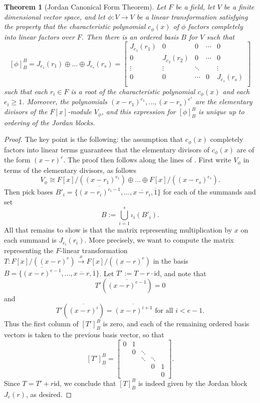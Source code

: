\documentclass[12pt]{report}
\newtheorem{theorem}{Theorem}[chapter]
\numberwithin{equation}{section}
\numberwithin{theorem}{chapter}
\theoremstyle{definition}
\newtheorem*{basic properties}{Basic Properties}
\newtheorem*{Important Remark}{Important Remark}
\begin{document}
\begin{theorem}[Jordan Canonical Form Theorem]\label{JCF}
Let $F$ be a field, let $V$ be a finite dimensional vector space, and let $\phi: V \to V$ be a linear transformation satisfying the property that the characteristic polynomial $c_\phi(x)$ of $\phi$ factors completely into linear factors over $F$. Then there is an ordered basis $B$ for $V$ such that 
$$[\phi]_B^B = J_{e_1}(r_1) \oplus \dots \oplus J_{e_s}(r_s)=
\begin{bmatrix}
J_{e_1}(r_1) & 0 & 0 & \cdots & 0 \\
0 &  J_{e_2}(r_2)  & 0 & \cdots & 0 \\
\vdots & \vdots & \ddots &  & \vdots \\
0 & 0 & \cdots & 0 &  J_{e_s}(r_s) \\
\end{bmatrix}$$ 
such that each $r_i \in F$ is a root of the characteristic polynomial $c_\phi(x)$ and each $e_i \geqslant 1$. Moreover, the polynomials $(x - r_1)^{e_1},\ldots,(x - r_s)^{e^s}$ are the elementary divisors of the $F[x]$-module $V_\phi$, and this expression for $[\phi]_B^B$ is unique up to ordering of the Jordan blocks.
\end{theorem}
 
 
\begin{proof}
The key point is the following: the assumption that $c_\phi(x)$ completely factors into linear terms guarantees that the elementary divisors of $c_\phi(x)$ are of the form $(x-r)^e$.
The proof then follows along the lines of . 
First write $V_\phi$ in terms of the elementary divisors, as follows $$V_\phi\cong F[x]/((x - r_1)^{e_1})\oplus \dots \oplus F[x]/((x - r_s)^{e_s}).$$
Then pick bases $B'_i=\{\overline{(x-r_i)^{e_i-1}}, \ldots, \overline{x-r_i}, \overline{1}\}$ for each of the summands and set 
$$B := \bigcup_{i=1}^s \iota_i(B'_i).$$
All that remains to show is that the matrix representing multiplication by $x$ on each summand is $J_{e_i}(r_i)$. More precisely, we want to compute the matrix representing the $F$-linear transformation $T\!: F[x]/((x-r)^e) \xrightarrow{x} F[x]/((x-r)^e)$ in the basis $B = \{\overline{(x-r)^{e-1}}, \ldots, \overline{x-r}, \overline{1}\}$. Let $T' := T - r \cdot \mathrm{id}$, and note that
$$T'(\overline{(x-r)^{e-1}}) = 0$$
and
$$T'(\overline{(x-r)^{i}}) = \overline{(x-r)^{i+1}} \textrm{ for all } i < e-1.$$
Thus the first column of $[T']_B^B$ is zero, and each of the remaining ordered basis vectors is taken to the previous basis vector, so that
$$[T']_B^B = \begin{bmatrix}
0 & 1 &  \\
& 0 & \ddots \\
& & \ddots & \ddots\\
& & & 0 & 1\\
&&&& 0	
\end{bmatrix}.
$$
Since $T = T' + r \mathrm{id}$, we conclude that $[T]_B^B$ is indeed given by the Jordan block $J_{e}(r)$, as desired.
\end{proof}
\end{document}
